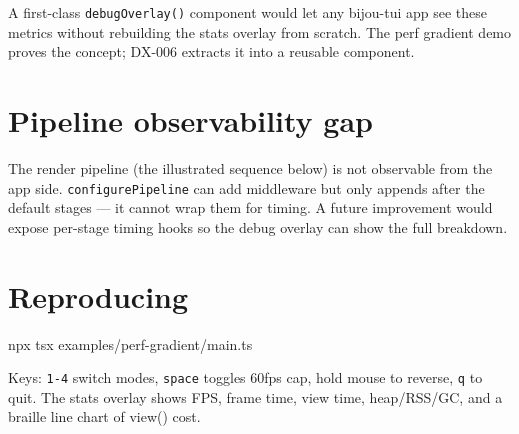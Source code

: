 A first-class \texttt{d\allowbreak{}e\allowbreak{}b\allowbreak{}u\allowbreak{}g\allowbreak{}O\allowbreak{}v\allowbreak{}e\allowbreak{}r\allowbreak{}l\allowbreak{}a\allowbreak{}y\allowbreak{}(\allowbreak{})} component would let any bijou-tui app see these metrics without rebuilding the stats overlay from scratch. The perf gradient demo proves the concept; DX-006 extracts it into a reusable component.

\section{Pipeline observability gap}\label{record-156-pipeline-observability-gap}

The render pipeline (the illustrated sequence below) is not observable from the app side. \texttt{c\allowbreak{}o\allowbreak{}n\allowbreak{}f\allowbreak{}i\allowbreak{}g\allowbreak{}u\allowbreak{}r\allowbreak{}e\allowbreak{}P\allowbreak{}i\allowbreak{}p\allowbreak{}e\allowbreak{}l\allowbreak{}i\allowbreak{}n\allowbreak{}e} can add middleware but only appends after the default stages --- it cannot wrap them for timing. A future improvement would expose per-stage timing hooks so the debug overlay can show the full breakdown.



\section{Reproducing}\label{record-156-reproducing}

\begin{CodeBlock}
npx tsx examples/perf-gradient/main.ts
\end{CodeBlock}

Keys: \texttt{1\allowbreak{}-\allowbreak{}4} switch modes, \texttt{s\allowbreak{}p\allowbreak{}a\allowbreak{}c\allowbreak{}e} toggles 60fps cap, hold mouse to reverse, \texttt{q} to quit. The stats overlay shows FPS, frame time, view time, heap/RSS/GC, and a braille line chart of view() cost.

